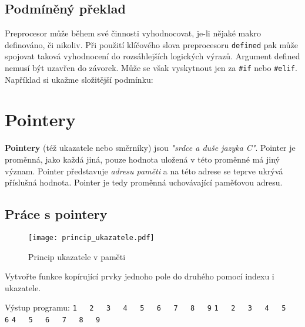    \subsection{Podmíněný překlad}  
      Preprocesor může během své činnosti vyhodnocovat, je-li nějaké makro definováno, či nikoliv. 
      Při použití klíčového slova preprocesoru \texttt{defined} pak může spojovat taková 
      vyhodnocení do rozsáhlejších logických výrazů. Argument defined nemusí být uzavřen do 
      závorek. Může se však vyskytnout jen za \lstinline[basicstyle=\ttfamily]!#if! nebo 
      \lstinline[basicstyle=\ttfamily]!#elif!. Například si ukažme složitější podmínku:

  \section{Pointery}
    \textbf{Pointery} (též ukazatele nebo směrníky) jsou \emph{"srdce a duše jazyka C"}. Pointer je 
    proměnná, jako každá jiná, pouze hodnota uložená v této proměnné má jiný význam. Pointer 
    představuje \textit{adresu paměti} a na této adrese se teprve ukrývá příslušná hodnota. Pointer 
    je tedy proměnná uchovávající paměťovou adresu.\cite{Herout}
  
    \subsection{Práce s pointery}
      \begin{figure}
        \centering
        \texttt{[image: princip\_ukazatele.pdf]}
        \caption{Princip ukazatele v paměti}
        \label{figure:pointer1}
      \end{figure}
      \begin{example}Vytvořte funkce kopírující prvky jednoho pole do druhého pomocí indexu i 
      ukazatele.
      
        
        Výstup programu:                                                     \newline
          \lstinline[basicstyle=\ttfamily]!1   2   3   4   5   6   7   8   9!\newline
          \lstinline[basicstyle=\ttfamily]!1   2   3   4   5   6!            \newline
          \lstinline[basicstyle=\ttfamily]!4   5   6   7   8   9!            \newline
      \end{example} 

